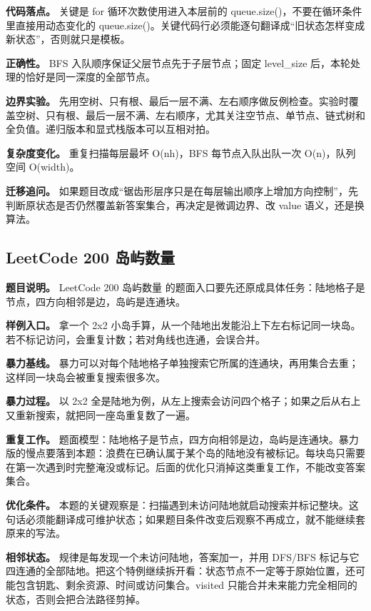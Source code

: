 \textbf{代码落点。} 关键是 for 循环次数使用进入本层前的 queue.size()，不要在循环条件里直接用动态变化的 queue.size()。关键代码行必须能逐句翻译成“旧状态怎样变成新状态”，否则就只是模板。

\textbf{正确性。} BFS 入队顺序保证父层节点先于子层节点；固定 level\_size 后，本轮处理的恰好是同一深度的全部节点。

\textbf{边界实验。} 先用空树、只有根、最后一层不满、左右顺序做反例检查。实验时覆盖空树、只有根、最后一层不满、左右顺序，尤其关注空节点、单节点、链式树和全负值。递归版本和显式栈版本可以互相对拍。

\textbf{复杂度变化。} 重复扫描每层最坏 O(nh)，BFS 每节点入队出队一次 O(n)，队列空间 O(width)。

\textbf{迁移追问。} 如果题目改成“锯齿形层序只是在每层输出顺序上增加方向控制”，先判断原状态是否仍然覆盖新答案集合，再决定是微调边界、改 value 语义，还是换算法。

\subsection{LeetCode 200 岛屿数量}

\textbf{题目说明。} LeetCode 200 岛屿数量 的题面入口要先还原成具体任务：陆地格子是节点，四方向相邻是边，岛屿是连通块。

\textbf{样例入口。} 拿一个 2x2 小岛手算，从一个陆地出发能沿上下左右标记同一块岛。若不标记访问，会重复计数；若对角线也连通，会误合并。

\textbf{暴力基线。} 暴力可以对每个陆地格子单独搜索它所属的连通块，再用集合去重；这样同一块岛会被重复搜索很多次。

\textbf{暴力过程。} 以 2x2 全是陆地为例，从左上搜索会访问四个格子；如果之后从右上又重新搜索，就把同一座岛重复数了一遍。

\textbf{重复工作。} 题面模型：陆地格子是节点，四方向相邻是边，岛屿是连通块。暴力版的慢点要落到本题：浪费在已确认属于某个岛的陆地没有被标记。每块岛只需要在第一次遇到时完整淹没或标记。后面的优化只消掉这类重复工作，不能改变答案集合。

\textbf{优化条件。} 本题的关键观察是：扫描遇到未访问陆地就启动搜索并标记整块。这句话必须能翻译成可维护状态；如果题目条件改变后观察不再成立，就不能继续套原来的写法。

\textbf{相邻状态。} 规律是每发现一个未访问陆地，答案加一，并用 DFS/BFS 标记与它四连通的全部陆地。把这个特例继续拆开看：状态节点不一定等于原始位置，还可能包含钥匙、剩余资源、时间或访问集合。visited 只能合并未来能力完全相同的状态，否则会把合法路径剪掉。

